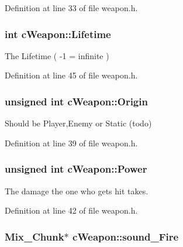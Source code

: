 Definition at line 33 of file weapon.\-h.

\hypertarget{classc_weapon_a7bc9a58e30a80556ba83e32067657b74}{
\subsubsection[{Lifetime}]{\setlength{\rightskip}{0pt plus 5cm}int c\-Weapon\-::\-Lifetime}}\label{classc_weapon_a7bc9a58e30a80556ba83e32067657b74}


The Lifetime ( -\/1 = infinite ) 



Definition at line 45 of file weapon.\-h.

\hypertarget{classc_weapon_a2a521dd1a2aa10d5f6c0b45c09932519}{
\subsubsection[{Origin}]{\setlength{\rightskip}{0pt plus 5cm}unsigned int c\-Weapon\-::\-Origin}}\label{classc_weapon_a2a521dd1a2aa10d5f6c0b45c09932519}


Should be Player,Enemy or Static (todo) 



Definition at line 39 of file weapon.\-h.

\hypertarget{classc_weapon_aa33960894f9ca703e3b3ad6a9f7f3f67}{
\subsubsection[{Power}]{\setlength{\rightskip}{0pt plus 5cm}unsigned int c\-Weapon\-::\-Power}}\label{classc_weapon_aa33960894f9ca703e3b3ad6a9f7f3f67}


The damage the one who gets hit takes. 



Definition at line 42 of file weapon.\-h.

\hypertarget{classc_weapon_a3502c93a2f35dbcc0f9e91598de8f864}{
\subsubsection[{sound\-\_\-\-Fire}]{\setlength{\rightskip}{0pt plus 5cm}Mix\-\_\-\-Chunk$\ast$ c\-Weapon\-::sound\-\_\-\-Fire}}\label{classc_weapon_a3502c93a2f35dbcc0f9e91598de8f864}


